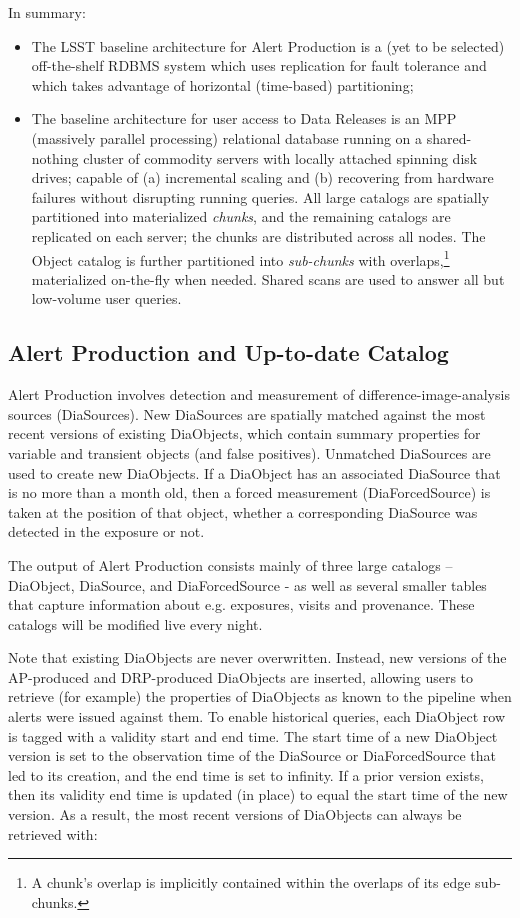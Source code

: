 \documentclass[DM,toc]{lsstdoc}
\begin{document}
In summary:

\begin{itemize}
\item
  The LSST baseline architecture for Alert Production is a (yet to be
  selected) off-the-shelf RDBMS system which uses replication for fault
  tolerance and which takes advantage of horizontal (time-based)
  partitioning;
\item
  The baseline architecture for user access to Data Releases is an MPP
  (massively parallel processing) relational database running on a
  shared-nothing cluster of commodity servers with locally attached
  spinning disk drives; capable of (a) incremental scaling and (b)
  recovering from hardware failures without disrupting running queries.
  All large catalogs are spatially partitioned into materialized
  \emph{chunks}, and the remaining catalogs are replicated on each server;
  the chunks are distributed across all nodes. The Object catalog is
  further partitioned into \emph{sub-chunks} with overlaps,\footnote{A
  chunk's overlap is implicitly contained within the overlaps of its
  edge sub-chunks.} materialized on-the-fly when needed. Shared scans
  are used to answer all but low-volume user queries.
\end {itemize}

\subsection{Alert Production and Up-to-date Catalog}\label{alert-production-and-up-to-date-catalog}

Alert Production involves detection and measurement of difference-image-analysis
sources (DiaSources). New DiaSources are spatially matched against
the most recent versions of existing DiaObjects, which contain summary
properties for variable and transient objects (and false positives). Unmatched
DiaSources are used to create new DiaObjects. If a DiaObject has an associated
DiaSource that is no more than a month old, then a forced measurement
(DiaForcedSource) is taken at the position of that object, whether a
corresponding DiaSource was detected in the exposure or not.

The output of Alert Production consists mainly of three large catalogs --
DiaObject, DiaSource, and DiaForcedSource - as well as several smaller tables
that capture information about e.g. exposures, visits and provenance.
These catalogs will be modified live every night.

Note that existing DiaObjects are never overwritten. Instead, new versions of
the AP-produced and DRP-produced DiaObjects are inserted, allowing users to
retrieve (for example) the properties of DiaObjects as known to the pipeline
when alerts were issued against them. To enable historical queries, each
DiaObject row is tagged with a validity start and end time. The start time of
a new DiaObject version is set to the observation time of the DiaSource or
DiaForcedSource that led to its creation, and the end time is set to infinity.
If a prior version exists, then its validity end time is updated (in place) to
equal the start time of the new version. As a result, the most recent versions
of DiaObjects can always be retrieved with:
\end{document}
